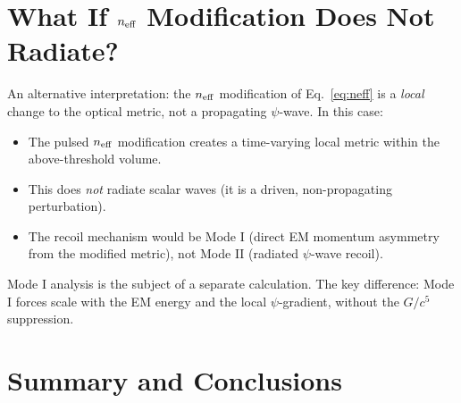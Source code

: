 \documentclass[11pt]{article}
\newcommand{\neff}{n_{\rm eff}}
\begin{document}
\section{What If $\neff$ Modification Does Not Radiate?}\label{sec:mode1}

An alternative interpretation: the $\neff$ modification of
Eq.~\eqref{eq:neff} is a \emph{local} change to the optical metric,
not a propagating $\psi$-wave. In this case:

\begin{itemize}
\item The pulsed $\neff$ modification creates a time-varying local metric
  within the above-threshold volume.
\item This does \emph{not} radiate scalar waves (it is a driven,
  non-propagating perturbation).
\item The recoil mechanism would be Mode I (direct EM momentum asymmetry
  from the modified metric), not Mode II (radiated $\psi$-wave recoil).
\end{itemize}

Mode I analysis is the subject of a separate calculation. The key
difference: Mode I forces scale with the EM energy and the local
$\psi$-gradient, without the $G/c^5$ suppression.

\section{Summary and Conclusions}\label{sec:summary}
\end{document}
